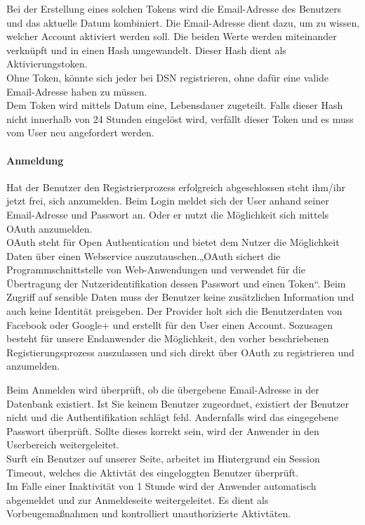 Bei der Erstellung eines solchen Tokens wird die Email-Adresse des Benutzers und das aktuelle Datum kombiniert. Die Email-Adresse dient dazu, um zu wissen, welcher Account aktiviert werden soll. Die beiden Werte werden miteinander verknüpft und in einen Hash umgewandelt. Dieser Hash dient als Aktivierungstoken.\\
Ohne Token, könnte sich jeder bei DSN registrieren, ohne dafür eine valide Email-Adresse haben zu müssen.\\

Dem Token wird mittels Datum eine, Lebensdauer zugeteilt. Falls dieser Hash nicht innerhalb von 24 Stunden eingelöst wird, verfällt dieser Token und es muss vom User neu angefordert werden. 

\paragraph{Anmeldung}
Hat der Benutzer den Registrierprozess erfolgreich abgeschlossen steht ihm/ihr jetzt frei, sich anzumelden. Beim Login meldet sich der User anhand seiner Email-Adresse und Passwort an. Oder er nutzt die Möglichkeit sich mittels OAuth anzumelden.\\

OAuth steht für Open Authentication und bietet dem Nutzer die Möglichkeit Daten über einen Webservice auszutauschen.„OAuth sichert die Programmschnittstelle von Web-Anwendungen und verwendet für die Übertragung der Nutzeridentifikation dessen Passwort und einen Token“\cite{OAUTH}. Beim Zugriff auf sensible Daten muss der Benutzer keine zusätzlichen Information und auch keine Identität preisgeben. Der Provider holt sich die Benutzerdaten von Facebook oder Google+ und erstellt für den User einen Account. Sozusagen besteht für unsere Endanwender die Möglichkeit, den vorher beschriebenen Registierungsprozess auszulassen und sich direkt über OAuth zu registrieren und anzumelden.


Beim Anmelden wird überprüft, ob die übergebene Email-Adresse in der Datenbank existiert. Ist Sie keinem Benutzer zugeordnet, existiert der Benutzer nicht und die Authentifikation schlägt fehl. Andernfalls wird das eingegebene Passwort überprüft. Sollte dieses korrekt sein, wird der Anwender in den Userbereich weitergeleitet.\\

Surft ein Benutzer auf unserer Seite, arbeitet im Hintergrund ein Session Timeout, welches die Aktivtät des eingeloggten Benutzer überprüft.\\
Im Falle einer Inaktivität von 1 Stunde wird der Anwender automatisch abgemeldet und zur Anmeldeseite weitergeleitet. Es dient als Vorbeugemaßnahmen und kontrolliert unauthorizierte Aktivtäten.

